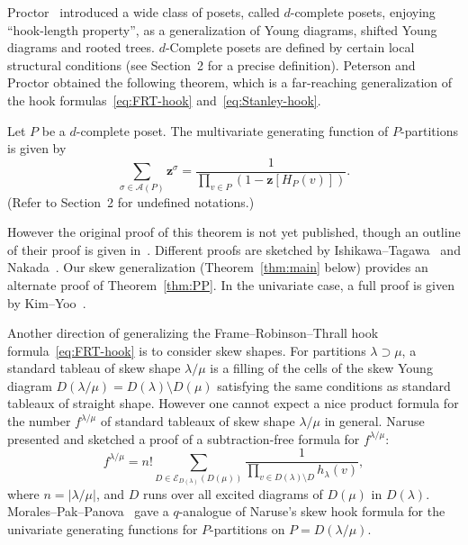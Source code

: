\documentclass[ALCO,ThmDefs,Unicode,epreuves]{cedram}
\newcommand\vectz{\boldsymbol{z}}
\newcommand\AP{\mathcal{A}}
\newcommand\EE{\mathcal{E}}
\begin{document}
Proctor~\cite{Proc1, Proc2} introduced a wide class of posets, 
called $d$-complete posets, enjoying ``hook-length property'', 
as a generalization of Young diagrams, shifted Young diagrams and rooted trees.
$d$-Complete posets are defined by certain local structural conditions 
(see Section~2 for a precise definition).
Peterson and Proctor obtained the following theorem, which is a far-reaching generalization 
of the hook formulas~\eqref{eq:FRT-hook} and~\eqref{eq:Stanley-hook}.

\begin{theo}
\label{thm:PP}
Let $P$ be a $d$-complete poset.
The multivari\-ate generating function of $P$-partitions is given by
\begin{equation}
\label{eq:PP-hook}
\sum_{\sigma \in \AP(P)} \vectz^{\sigma}
 =
\frac{ 1 }
 { \prod_{v \in P} (1 - \vectz[H_P(v)]) }.
\end{equation}
(Refer to Section~2 for undefined notations.)
\end{theo}

However the original proof of this theorem is not yet published, 
though an outline of their proof is given in~\cite{Proc3}.
Different proofs are sketched by Ishikawa--Tagawa~\cite{IT1, IT2} and Nakada~\cite{N3, N2}.
Our skew generalization (Theorem~\ref{thm:main} below) provides an alternate proof of Theorem~\ref{thm:PP}.
In the univariate case, a full proof is given by Kim--Yoo~\cite{KY}.

Another direction of generalizing the Frame--Robinson--Thrall hook formula~\eqref{eq:FRT-hook} 
is to consider skew shapes.
For partitions $\lambda \supset \mu$, 
a standard tableau of skew shape $\lambda/\mu$ is a filling of the cells of the skew Young diagram 
$D(\lambda/\mu) = D(\lambda) \setminus D(\mu)$ satisfying the same conditions as standard tableaux 
of straight shape.
However one cannot expect a nice product formula for the number $f^{\lambda/\mu}$ of 
standard tableaux of skew shape $\lambda/\mu$ in general.
Naruse~\cite{Naruse} presented and sketched a proof of a subtraction-free formula for $f^{\lambda/\mu}$:
\begin{equation}
\label{eq:Naruse-hook}
f^{\lambda/\mu}
 =
n!
\sum_{D \in \EE_{D(\lambda)}(D(\mu))} 
 \frac{ 1 }
 { \prod_{v \in D(\lambda) \setminus D} h_\lambda(v) },
\end{equation}
where $n = |\lambda/\mu|$, 
and $D$ runs over all excited diagrams of $D(\mu)$ in $D(\lambda)$.
Morales--Pak--Panova~\cite{MPP} gave a $q$-analogue of Naruse's skew hook formula 
for the univariate generating functions for $P$-partitions on $P = D(\lambda/\mu)$.
\end{document}
